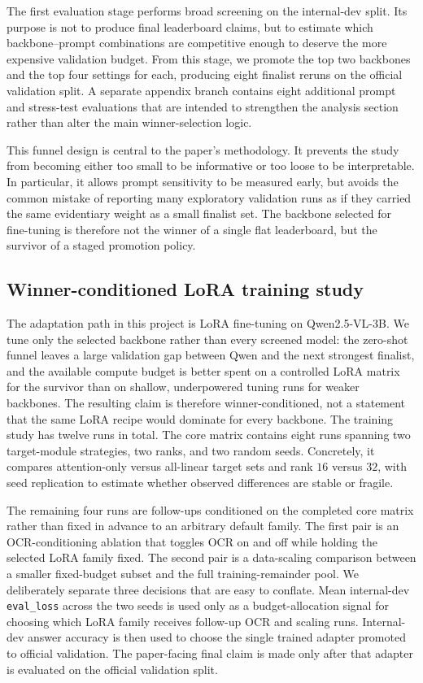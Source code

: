 The first evaluation stage performs broad screening on the internal-dev split. Its purpose is not to produce final leaderboard claims, but to estimate which backbone--prompt combinations are competitive enough to deserve the more expensive validation budget. From this stage, we promote the top two backbones and the top four settings for each, producing eight finalist reruns on the official validation split. A separate appendix branch contains eight additional prompt and stress-test evaluations that are intended to strengthen the analysis section rather than alter the main winner-selection logic.

This funnel design is central to the paper's methodology. It prevents the study from becoming either too small to be informative or too loose to be interpretable. In particular, it allows prompt sensitivity to be measured early, but avoids the common mistake of reporting many exploratory validation runs as if they carried the same evidentiary weight as a small finalist set. The backbone selected for fine-tuning is therefore not the winner of a single flat leaderboard, but the survivor of a staged promotion policy.

\subsection{Winner-conditioned LoRA training study}

The adaptation path in this project is LoRA fine-tuning on Qwen2.5-VL-3B. We tune only the selected backbone rather than every screened model: the zero-shot funnel leaves a large validation gap between Qwen and the next strongest finalist, and the available compute budget is better spent on a controlled LoRA matrix for the survivor than on shallow, underpowered tuning runs for weaker backbones. The resulting claim is therefore winner-conditioned, not a statement that the same LoRA recipe would dominate for every backbone. The training study has twelve runs in total. The core matrix contains eight runs spanning two target-module strategies, two ranks, and two random seeds. Concretely, it compares attention-only versus all-linear target sets and rank $16$ versus $32$, with seed replication to estimate whether observed differences are stable or fragile.

The remaining four runs are follow-ups conditioned on the completed core matrix rather than fixed in advance to an arbitrary default family. The first pair is an OCR-conditioning ablation that toggles OCR on and off while holding the selected LoRA family fixed. The second pair is a data-scaling comparison between a smaller fixed-budget subset and the full training-remainder pool. We deliberately separate three decisions that are easy to conflate. Mean internal-dev \texttt{eval\_loss} across the two seeds is used only as a budget-allocation signal for choosing which LoRA family receives follow-up OCR and scaling runs. Internal-dev answer accuracy is then used to choose the single trained adapter promoted to official validation. The paper-facing final claim is made only after that adapter is evaluated on the official validation split.


